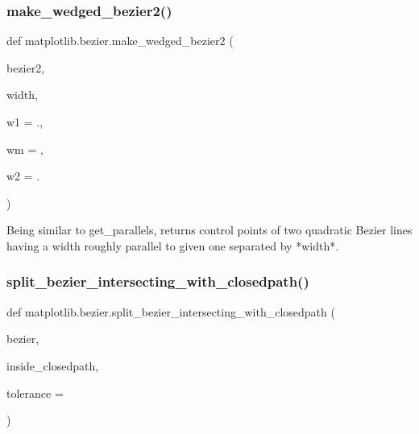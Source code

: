 \subsubsection{\texorpdfstring{make\+\_\+wedged\+\_\+bezier2()}{make\_wedged\_bezier2()}}
{\footnotesize\ttfamily def matplotlib.\+bezier.\+make\+\_\+wedged\+\_\+bezier2 (\begin{DoxyParamCaption}\item[{}]{bezier2,  }\item[{}]{width,  }\item[{}]{w1 = {.},  }\item[{}]{wm = {},  }\item[{}]{w2 = {.} }\end{DoxyParamCaption})}

\begin{DoxyVerb}Being similar to get_parallels, returns control points of two quadratic
Bezier lines having a width roughly parallel to given one separated by
*width*.
\end{DoxyVerb}
 \mbox{\label{namespacematplotlib_1_1bezier_a476a969792273227a0918f06955857a4}} 
\subsubsection{\texorpdfstring{split\+\_\+bezier\+\_\+intersecting\+\_\+with\+\_\+closedpath()}{split\_bezier\_intersecting\_with\_closedpath()}}
{\footnotesize\ttfamily def matplotlib.\+bezier.\+split\+\_\+bezier\+\_\+intersecting\+\_\+with\+\_\+closedpath (\begin{DoxyParamCaption}\item[{}]{bezier,  }\item[{}]{inside\+\_\+closedpath,  }\item[{}]{tolerance = {} }\end{DoxyParamCaption})}

